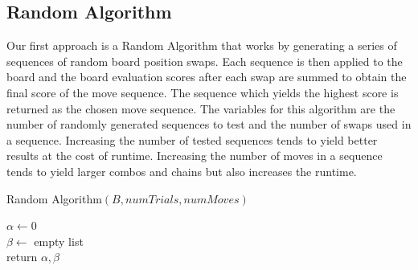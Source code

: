 \documentclass[10pt, final]{article}
\begin{document}
\subsection{Random Algorithm}
Our first approach is a Random Algorithm that works by generating a series of sequences of random board position swaps. Each sequence is then applied to the board and the board evaluation scores after each swap are summed to obtain the final score of the move sequence. The sequence which yields the highest score is returned as the chosen move sequence. The variables for this algorithm are the number of randomly generated sequences to test and the number of swaps used in a sequence. Increasing the number of tested sequences tends to yield better results at the cost of runtime. Increasing the number of moves in a sequence tends to yield larger combos and chains but also increases the runtime.
\begin{algorithm}\label{random}\small
\caption{\small Random Algorithm$(B, numTrials, numMoves)$}
$\alpha \gets 0$ \\
$\beta \gets $ empty list\\
return $\alpha, \beta$
\end{algorithm}
\end{document}
